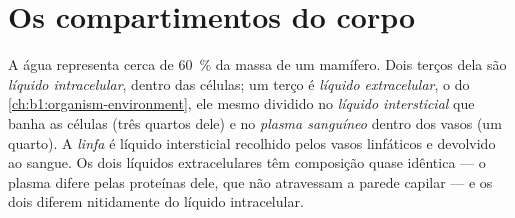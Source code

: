 \section{Os compartimentos do corpo}

\begin{definition}\label{def:b1:mammal-organization:compartments}
A água representa cerca de \qty{60}{\%} da massa de um mamífero. Dois
terços dela são \emph{líquido intracelular},
dentro das células; um terço é
\emph{líquido extracelular}, o 
do \cref{ch:b1:organism-environment}, ele mesmo dividido no
\emph{líquido intersticial} que banha as
células (três quartos dele) e no \emph{plasma sanguíneo}
dentro dos vasos (um quarto). A \emph{linfa} é líquido
intersticial recolhido pelos vasos linfáticos e devolvido ao sangue. Os
dois líquidos extracelulares têm composição quase idêntica --- o plasma
difere pelas proteínas dele, que não atravessam a parede capilar --- e
os dois diferem nitidamente do líquido intracelular.
\end{definition}

